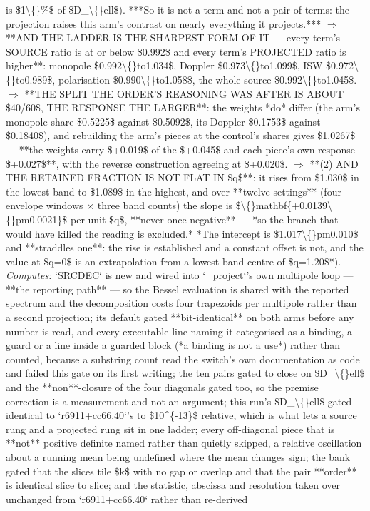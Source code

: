 \begin{description}
is \$1\textbackslash\{\}\%\$ of \$D\_\textbackslash\{\}ell\$). ***So it is not a term and not a pair of terms: the projection raises this arm's contrast on nearly everything it projects.*** \ensuremath{\Rightarrow}  **AND THE LADDER IS THE SHARPEST FORM OF IT --- every term's SOURCE ratio is at or below \$0.992\$ and every term's PROJECTED ratio is higher**: monopole \$0.992\textbackslash\{\}to1.034\$, Doppler \$0.973\textbackslash\{\}to1.099\$, ISW \$0.972\textbackslash\{\}to0.989\$, polarisation \$0.990\textbackslash\{\}to1.058\$, the whole source \$0.992\textbackslash\{\}to1.045\$. \ensuremath{\Rightarrow}  **THE SPLIT THE ORDER'S REASONING WAS AFTER IS ABOUT \$40/60\$, THE RESPONSE THE LARGER**: the weights *do* differ (the arm's monopole share \$0.5225\$ against \$0.5092\$, its Doppler \$0.1753\$ against \$0.1840\$), and rebuilding the arm's pieces at the control's shares gives \$1.0267\$ --- **the weights carry \$+0.019\$ of the \$+0.045\$ and each piece's own response \$+0.027\$**, with the reverse construction agreeing at \$+0.020\$. \ensuremath{\Rightarrow}  **(2) AND THE RETAINED FRACTION IS NOT FLAT IN \$q\$**: it rises from \$1.030\$ in the lowest band to \$1.089\$ in the highest, and over **twelve settings** (four envelope windows \ensuremath{\times} three band counts) the slope is \$\textbackslash\{\}mathbf\{+0.0139\textbackslash\{\}pm0.0021\}\$ per unit \$q\$, **never once negative** --- *so the branch that would have killed the reading is excluded.*  *The intercept is \$1.017\textbackslash\{\}pm0.010\$ and **straddles one**: the rise is established and a constant offset is not, and the value at \$q=0\$ is an extrapolation from a lowest band centre of \$q=1.20\$*). 
\emph{Computes:} `SRCDEC` is new and wired into `\_project`'s own multipole loop --- **the reporting path** --- so the Bessel evaluation is shared with the reported spectrum and the decomposition costs four trapezoids per multipole rather than a second projection; its default gated **bit-identical** on both arms before any number is read, and every executable line naming it categorised as a binding, a guard or a line inside a guarded block (*a binding is not a use*) rather than counted, because a substring count read the switch's own documentation as code and failed this gate on its first writing; the ten pairs gated to close on \$D\_\textbackslash\{\}ell\$ and the **non**-closure of the four diagonals gated too, so the premise correction is a measurement and not an argument; this run's \$D\_\textbackslash\{\}ell\$ gated identical to `r6911+cc66.40`'s to \$10\textasciicircum{}\{-13\}\$ relative, which is what lets a source rung and a projected rung sit in one ladder; every off-diagonal piece that is **not** positive definite named rather than quietly skipped, a relative oscillation about a running mean being undefined where the mean changes sign; the bank gated that the slices tile \$k\$ with no gap or overlap and that the pair **order** is identical slice to slice; and the statistic, abscissa and resolution taken over unchanged from `r6911+cc66.40` rather than re-derived

\end{description}
